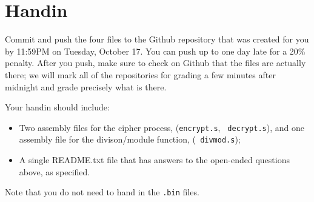 \documentclass{article}
\begin{document}
\section{Handin}

Commit and push the four files to the Github repository that was created
for you by 11:59PM on Tuesday, October 17. You can push up to one day late for
a 20\% penalty. After you push, make sure to check on Github that the files are
actually there; we will mark all of the repositories for grading a few minutes
after midnight and grade precisely what is there.

Your handin should include:

\begin{itemize}
\item Two assembly files for the cipher process, ({\tt encrypt.s}, {\tt 
decrypt.s}), and one assembly file for the divison/module function, ({\tt 
divmod.s}); 
\item A single README.txt file that has answers to the open-ended questions
above, as specified.
\end{itemize}

Note that you do not need to hand in the {\tt .bin} files.
\end{document}
